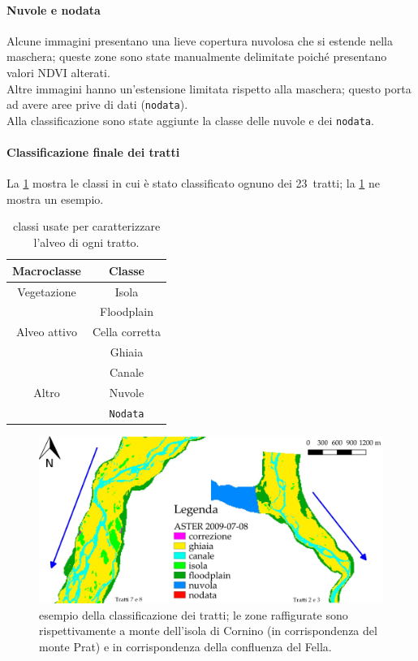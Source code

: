 \paragraph{Nuvole e nodata}
Alcune immagini presentano una lieve copertura nuvolosa che si estende nella maschera; queste zone sono state manualmente delimitate poiché presentano valori NDVI alterati.
\\
Altre immagini hanno un'estensione limitata rispetto alla maschera; questo porta ad avere aree prive di dati (\texttt{nodata}).
\\
Alla classificazione sono state aggiunte la classe delle nuvole e dei \texttt{nodata}.
%
%
\paragraph{Classificazione finale dei tratti}
La \cref{tab:class-tratti} mostra le classi in cui è stato classificato ognuno dei 23~tratti; la \cref{fig:class-is-fl} ne mostra un esempio.
%
\begin{table}[ht]
	\centering
	\begin{tabular}{
		c 
		c
		}
		\toprule
		\textbf{Macroclasse}	&	\textbf{Classe}	\\
		\midrule
		Vegetazione		&	Isola	\\
						&	Floodplain	\\
		\midrule
		Alveo attivo	&	Cella corretta	\\
						&	Ghiaia	\\
						&	Canale	\\
		\midrule
		Altro			&	Nuvole	\\
						&	\texttt{Nodata}	\\
		\bottomrule
	\end{tabular}
	\caption[classi utilizzate per caratterizzare l'alveo dei tratti]{classi usate per caratterizzare l'alveo di ogni tratto.}
	\label{tab:class-tratti}
\end{table}
%
\begin{figure}[ht]
	\centering
	\includegraphics[width=\textwidth]{files/esempio_class_is_fl.jpeg}
	\caption[esempio della classificazione dei tratti]{esempio della classificazione dei tratti; le zone raffigurate sono rispettivamente a monte dell'isola di Cornino (in corrispondenza del monte Prat) e in corrispondenza della confluenza del Fella.}
	\label{fig:class-is-fl}
\end{figure}
%
%
%
